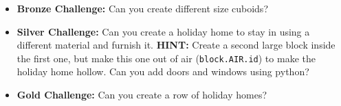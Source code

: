 \documentclass{geocraft-worksheet}
\begin{document}
\begin{itemize}
\item\textbf{Bronze Challenge:} Can you create different size cuboids?  

\item\textbf{Silver Challenge:} Can you create a holiday home to stay in using a different material and furnish
  it. \textbf{HINT:} Create a second large block inside the first one, but make this one out of air
  (\lstinline{block.AIR.id}) to make the holiday home hollow. Can you add doors and windows using python?

\item\textbf{Gold Challenge:} Can you create a row of holiday homes?
\end{itemize}
\end{document}
